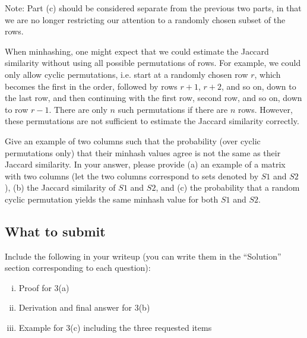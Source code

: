 Note: Part (c) should be considered separate from the previous two parts, in that we are no longer restricting our attention to a randomly chosen subset of the rows.

When minhashing, one might expect that we could estimate the Jaccard similarity without using all possible permutations of rows. For example, we could only allow cyclic permutations, i.e. start at a randomly chosen row $r$, which becomes the first in the order, followed by rows $r + 1$, $r + 2$, and so on, down to the last row, and then continuing with the first row, second row, and so on, down to row $r - 1$. There are only $n$ such permutations if there are $n$ rows. However, these permutations are not sufficient to estimate the Jaccard similarity correctly.

Give an example of two columns such that the probability (over cyclic permutations only) that their minhash values agree is not the same as their Jaccard similarity. In your answer, please provide (a) an example of a matrix with two columns (let the two columns correspond to sets denoted by $S1$ and $S2$), (b) the Jaccard similarity of $S1$ and $S2$, and (c) the probability that a random cyclic permutation yields the same minhash value for both $S1$ and $S2$.

\Solution{}

\subsection*{What to submit}
Include the following in your writeup (you can write them in the ``\/Solution{}'' section corresponding to each question):
\begin{enumerate}[(i)]
\item Proof for 3(a)
\item Derivation and final answer for 3(b)
\item Example for 3(c) including the three requested items
\end{enumerate}
